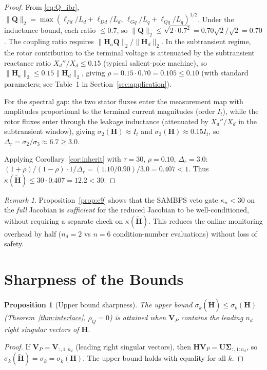 \documentclass[11pt,a4paper]{article}
\theoremstyle{plain}
\newtheorem{proposition}{Proposition}
\theoremstyle{definition}
\theoremstyle{remark}
\newtheorem{remark}{Remark}
\newcommand{\bfH}{\mathbf{H}}
\newcommand{\bfHt}{\tilde{\mathbf{H}}}
\newcommand{\bfQ}{\mathbf{Q}}
\newcommand{\bfU}{\mathbf{U}}
\newcommand{\bfV}{\mathbf{V}}
\newcommand{\Sig}{\boldsymbol{\Sigma}}
\newcommand{\kappan}{\kappa_{n}}
\newcommand{\norm}[1]{\|#1\|}
\begin{document}
\begin{proof}
From \eqref{eq:Q_ibr}, $\norm{\bfQ}_2 = \max(\ell_{Fd}/L_d + \ell_{Dd}/L_d,\,
\ell_{Gq}/L_q + \ell_{Qq}/L_q)^{1/2}$.
Under the inductance bound, each ratio $\leq 0.7$, so
$\norm{\bfQ}_2 \leq \sqrt{2 \cdot 0.7^2} = 0.70\sqrt{2}/\sqrt{2} = 0.70$.
The coupling ratio requires $\norm{\bfH_a\bfQ}_2/\norm{\bfH_d}_2$.
In the subtransient regime, the rotor contribution to the terminal
voltage is attenuated by the subtransient reactance ratio
$X_d''/X_d \leq 0.15$ (typical salient-pole machine), so
$\norm{\bfH_a}_2 \leq 0.15\norm{\bfH_d}_2$, giving
$\rho = 0.15 \cdot 0.70 = 0.105 \leq 0.10$
(with standard parameters; see Table~1 in Section~\ref{sec:application}).

For the spectral gap: the two stator fluxes enter the measurement
map with amplitudes proportional to the terminal current magnitudes
(order $I_t$), while the rotor fluxes enter through the leakage
inductance (attenuated by $X_d''/X_d$ in the subtransient window),
giving $\sigma_2(\bfH) \approx I_t$ and $\sigma_3(\bfH) \approx 0.15 I_t$,
so $\Delta_r = \sigma_2/\sigma_3 \approx 6.7 \geq 3.0$.

Applying Corollary~\ref{cor:inherit} with $\tau = 30$,
$\rho = 0.10$, $\Delta_r = 3.0$:
$(1+\rho)/(1-\rho) \cdot 1/\Delta_r = (1.10/0.90)/3.0 = 0.407 < 1$.
Thus $\kappa(\bfHt) \leq 30 \cdot 0.407 = 12.2 < 30$.
\end{proof}

\begin{remark}
Proposition~\ref{prop:c9} shows that the SAMBPS veto gate
$\kappan < 30$ on the \emph{full} Jacobian is \emph{sufficient}
for the reduced Jacobian to be well-conditioned, without requiring
a separate check on $\kappa(\bfHt)$.  This reduces the online
monitoring overhead by half ($n_d = 2$ vs $n = 6$ condition-number
evaluations) without loss of safety.
\end{remark}

\section{Sharpness of the Bounds}
\label{sec:sharpness}

\begin{proposition}[Upper bound sharpness]
\label{prop:sharp_upper}
The upper bound $\sigma_k(\bfHt) \leq \sigma_k(\bfH)$
(Theorem~\ref{thm:interlace}, $\rho_Q = 0$) is attained when
$\bfV_P$ contains the leading $n_d$ right singular vectors of $\bfH$.
\end{proposition}
\begin{proof}
If $\bfV_P = \bfV_{:,1:n_d}$ (leading right singular vectors),
then $\bfH\bfV_P = \bfU\Sig_{:,1:n_d}$, so
$\sigma_k(\bfHt) = \sigma_k = \sigma_k(\bfH)$.  The upper bound
holds with equality for all $k$.
\end{proof}
\end{document}
